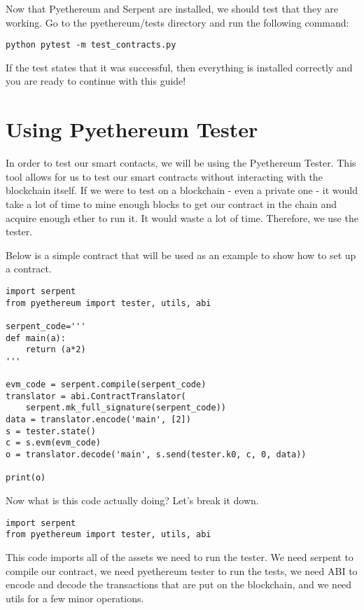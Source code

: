 \documentclass[12pt]{article}
\begin{document}
Now that Pyethereum and Serpent are installed, we should test that they are working. Go to the pyethereum/tests directory and run the following command:

\begin{lstlisting}
python pytest -m test_contracts.py
\end{lstlisting}

If the test states that it was successful, then everything is installed correctly and you are ready to continue with this guide!

\section{Using Pyethereum Tester}

In order to test our smart contacts, we will be using the Pyethereum Tester. This tool allows for us to test our smart contracts without interacting with the blockchain itself. If we were to test on a blockchain - even a private one - it would take a lot of time to mine enough blocks to get our contract in the chain and acquire enough ether to run it. It would waste a lot of time. Therefore, we use the tester.

Below is a simple contract that will be used as an example to show how to set up a contract. \cite{test_contracts.py,Using pyethereum.tester}

\begin{lstlisting}[frame=single]
import serpent
from pyethereum import tester, utils, abi

serpent_code='''
def main(a):
	return (a*2)
'''

evm_code = serpent.compile(serpent_code)
translator = abi.ContractTranslator(
	serpent.mk_full_signature(serpent_code))
data = translator.encode('main', [2])
s = tester.state()
c = s.evm(evm_code)
o = translator.decode('main', s.send(tester.k0, c, 0, data))

print(o)
\end{lstlisting}

Now what is this code actually doing? Let's break it down.

\begin{lstlisting}
import serpent
from pyethereum import tester, utils, abi
\end{lstlisting}

This code imports all of the assets we need to run the tester. We need serpent to compile our contract, we need pyethereum tester to run the tests, we need ABI to encode and decode the transactions that are put on the blockchain, and we need utils for a few minor operations.
\end{document}
